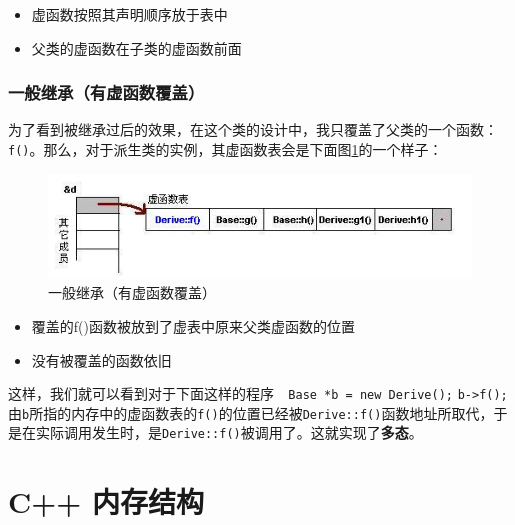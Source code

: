 \documentclass[UTF8,a4paper,12pt]{ctexbook} %
\begin{document}
			     \begin{itemize}
			     	\item 虚函数按照其声明顺序放于表中
			     	\item 父类的虚函数在子类的虚函数前面
			     \end{itemize}
	      \subsection{一般继承（有虚函数覆盖）}
	        为了看到被继承过后的效果，在这个类的设计中，我只覆盖了父类的一个函数：\verb|f()|。那么，对于派生类的实例，其虚函数表会是下面图\ref{vir-yes}的一个样子：
	        
		         \begin{figure}[H]
		         	\centering
		         	\includegraphics[scale=0.8]{vt-base2.jpg}
		         	\caption{一般继承（有虚函数覆盖）\label{vir-yes}}
		         \end{figure}
		         
		         \begin{itemize}
		         	\item 覆盖的f()函数被放到了虚表中原来父类虚函数的位置
		         	\item 没有被覆盖的函数依旧
		         \end{itemize}
		         
		         这样，我们就可以看到对于下面这样的程序\verb|  Base *b = new Derive();| \verb|b->f();|由\verb|b|所指的内存中的虚函数表的\verb|f()|的位置已经被\verb|Derive::f()|函数地址所取代，于是在实际调用发生时，是\verb|Derive::f()|被调用了。这就实现了\textbf{多态}。

	
\chapter{C++ 内存结构}
\end{document}
